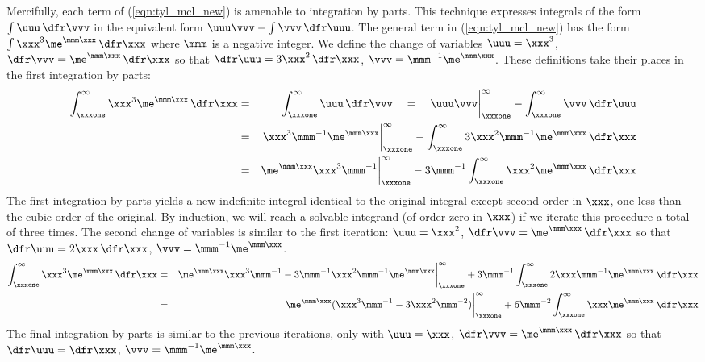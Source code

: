 \documentclass[12pt]{article}
\begin{document}
Mercifully, each term of (\ref{eqn:tyl_mcl_new}) is amenable to integration by parts.
This technique expresses integrals of the form $\int \uuu\,\dfr\vvv$ in the equivalent form $\uuu\vvv - \int \vvv\,\dfr\uuu$.
The general term in (\ref{eqn:tyl_mcl_new}) has the form
$\int \xxx^{3}\me^{\mmm\xxx} \,\dfr\xxx$ where $\mmm$ is a negative integer.
We define the change of variables $\uuu = \xxx^{3}$, $\dfr\vvv = \me^{\mmm\xxx}\,\dfr\xxx$ so that $\dfr\uuu = 3\xxx^{2}\,\dfr\xxx$, $\vvv = \mmm^{-1}\me^{\mmm\xxx}$.
These definitions take their places in the first integration by parts:
\begin{eqnarray}
\int_{\xxxone}^{\infty} \xxx^{3}\me^{\mmm\xxx} \,\dfr\xxx  
& = &
\int_{\xxxone}^{\infty} \uuu\,\dfr\vvv \quad = \quad
\uuu\vvv \bigg|_{\xxxone}^{\infty} - \int_{\xxxone}^{\infty} \vvv\,\dfr\uuu \nonumber \\
& = &
\xxx^{3}\mmm^{-1}\me^{\mmm\xxx}\bigg|_{\xxxone}^{\infty} - 
\int_{\xxxone}^{\infty} 3\xxx^{2} \mmm^{-1}\me^{\mmm\xxx} \,\dfr\xxx \nonumber \\
& = &
\me^{\mmm\xxx}\xxx^{3}\mmm^{-1}\bigg|_{\xxxone}^{\infty} - 
3\mmm^{-1} \int_{\xxxone}^{\infty} \xxx^{2}\me^{\mmm\xxx} \,\dfr\xxx
\label{eqn:srs_ntg_itr1}
\end{eqnarray}
The first integration by parts yields a new indefinite integral identical to the original integral except second order in $\xxx$, one less than the cubic order of the original.
By induction, we will reach a solvable integrand (of order zero in $\xxx$) if we iterate this procedure a total of three times.
The second change of variables is similar to the first iteration:
$\uuu = \xxx^{2}$, $\dfr\vvv = \me^{\mmm\xxx}\,\dfr\xxx$ so that $\dfr\uuu = 2\xxx\,\dfr\xxx$, $\vvv = \mmm^{-1}\me^{\mmm\xxx}$.
\begin{eqnarray}
\int_{\xxxone}^{\infty} \xxx^{3}\me^{\mmm\xxx} \,\dfr\xxx  
& = &
\me^{\mmm\xxx}\xxx^{3}\mmm^{-1} - 3\mmm^{-1}\xxx^{2} \mmm^{-1}\me^{\mmm\xxx} \bigg|_{\xxxone}^{\infty} + 3\mmm^{-1} \int_{\xxxone}^{\infty} 2\xxx\mmm^{-1}\me^{\mmm\xxx} \,\dfr\xxx \nonumber \\
& = &
\me^{\mmm\xxx}(\xxx^{3}\mmm^{-1} - 3\xxx^{2}\mmm^{-2}) \bigg|_{\xxxone}^{\infty} + 6\mmm^{-2} \int_{\xxxone}^{\infty} \xxx\me^{\mmm\xxx} \,\dfr\xxx
\label{eqn:srs_ntg_itr2}
\end{eqnarray}
The final integration by parts is similar to the previous iterations, only with
$\uuu = \xxx$, $\dfr\vvv = \me^{\mmm\xxx}\,\dfr\xxx$ so that $\dfr\uuu = \dfr\xxx$, $\vvv = \mmm^{-1}\me^{\mmm\xxx}$.
\end{document}
